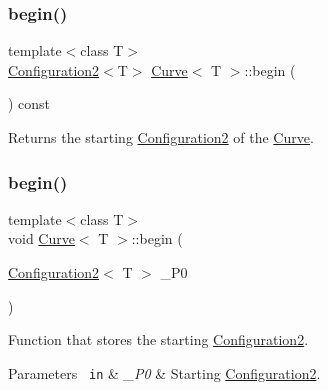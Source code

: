 \subsubsection{\texorpdfstring{begin()}{begin()}\hspace{0.1cm}{\footnotesize\ttfamily [1/2]}}
{\footnotesize\ttfamily template$<$class T$>$ \\
\mbox{\hyperlink{class_configuration2}{Configuration2}}$<$T$>$ \mbox{\hyperlink{class_curve}{Curve}}$<$ T $>$\+::begin (\begin{DoxyParamCaption}{ }\end{DoxyParamCaption}) const\hspace{0.3cm}{\ttfamily [inline]}}



Returns the starting {\ttfamily \mbox{\hyperlink{class_configuration2}{Configuration2}}} of the {\ttfamily \mbox{\hyperlink{class_curve}{Curve}}}. 

\mbox{\label{class_curve_a450ecb2eb0200c4f175ad5fc6afe4cb2}} 
\subsubsection{\texorpdfstring{begin()}{begin()}\hspace{0.1cm}{\footnotesize\ttfamily [2/2]}}
{\footnotesize\ttfamily template$<$class T$>$ \\
void \mbox{\hyperlink{class_curve}{Curve}}$<$ T $>$\+::begin (\begin{DoxyParamCaption}\item[{\mbox{\hyperlink{class_configuration2}{Configuration2}}$<$ T $>$}]{\+\_\+\+P0 }\end{DoxyParamCaption})\hspace{0.3cm}{\ttfamily [inline]}}

Function that stores the starting {\ttfamily \mbox{\hyperlink{class_configuration2}{Configuration2}}}. 
\begin{DoxyParams}[1]{Parameters}
\mbox{\texttt{ in}}  & {\em \+\_\+\+P0} & Starting {\ttfamily \mbox{\hyperlink{class_configuration2}{Configuration2}}}. \\
\hline
\end{DoxyParams}
\mbox{\label{class_curve_a08b72b1c8922c1132254d8f2b98fd78d}} 
